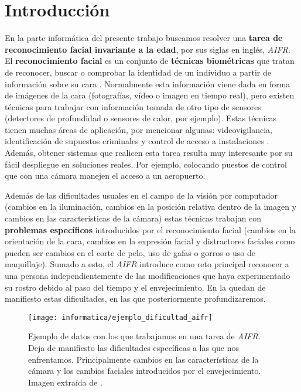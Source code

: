 \chapter{Introducción} \label{ich:introduccion}

En la parte informática del presente trabajo buscamos resolver una \textbf{tarea de reconocimiento facial invariante a la edad}, por sus siglas en inglés, \textit{AIFR}. El \textbf{reconocimiento facial} es un conjunto de \textbf{técnicas biométricas} que tratan de reconocer, buscar o comprobar  la identidad de un individuo a partir de información sobre su cara \cite{informatica:definicion_face_recognition}. Normalmente esta información viene dada en forma de imágenes de la cara (fotografías, vídeo o imagen en tiempo real), pero existen técnicas para trabajar con información tomada de otro tipo de sensores (detectores de profundidad o  sensores de calor, por ejemplo). Estas técnicas tienen muchas áreas de aplicación, por mencionar algunas: videovigilancia, identificación de supuestos criminales y control de acceso a instalaciones \cite{informatica:deep_fr_survey}. Además, obtener sistemas que realicen esta tarea resulta muy interesante por su fácil despliegue en soluciones reales. Por ejemplo, colocando puestos de control que con una cámara manejen el acceso a un aeropuerto.

Además de las dificultades usuales en el campo de la visión por computador (cambios en la iluminación, cambios en la posición relativa dentro de la imagen y cambios en las características de la cámara) estas técnicas trabajan con \textbf{problemas específicos} introducidos por el reconocimiento facial (cambios en la orientación de la cara, cambios en la expresión facial y distractores faciales como pueden ser cambios en el corte de pelo, uso de gafas o gorros o uso de maquillaje). Sumado a esto, el \textit{AIFR} introduce como reto principal reconocer a una persona independientemente de las modificaciones que haya experimentado su rostro debido al paso del tiempo y el envejecimiento. En la  quedan de manifiesto estas dificultades, en las que posteriormente profundizaremos.

\begin{figure}[h]
	\centering
	\texttt{[image: informatica/ejemplo\_dificultad\_aifr]}
	\caption{Ejemplo de datos con los que trabajamos en una tarea de \textit{AIFR}. Deja de manifiesto las dificultades específicas a las que nos enfrentamos. Principalmente cambios en las características de la cámara y los cambios faciales introducidos por el envejecimiento. Imagen extraída de \cite{informatica:aifr_survey}.}
	\label{img:ejemplo_dificultad_aifr}
\end{figure}

